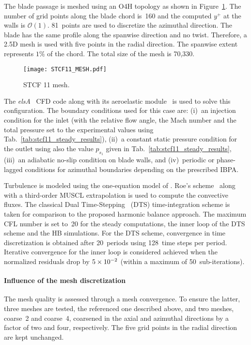 
The blade passage is meshed using an O4H topology as
shown in Figure~\ref{fig:stcf11_mesh}.
The number of grid points along the blade
chord is~160 and the computed $y^+$ at the walls is $\mathcal{O}(1)$.
81~points are used to discretize the azimuthal direction.
The blade has the same profile along the spanwise direction and no
twist. Therefore, a 2.5D mesh is used with five points 
in the radial direction. The spanwise
extent represents $1\%$ of the chord. 
The total size of the mesh is 70,330.
\begin{figure}[htp]
  \centering
  \texttt{[image: STCF11\_MESH.pdf]}
  \caption{STCF 11 mesh.}
  \label{fig:stcf11_mesh}
\end{figure}

The \textit{elsA}~\cite{Cambier2013} CFD code 
along with its aeroelastic
module~\cite{CIDugeai2011} is used to solve this configuration.
The boundary conditions used for this case are: (i)~an
injection condition  for the inlet (with the relative flow angle,
the Mach number and the total pressure
set to the experimental values using Tab.~\ref{tab:stcf11_steady_results}), 
(ii)~a constant static pressure
condition for the outlet using also the value $p_{s_1}$
given in Tab.~\ref{tab:stcf11_steady_results},  
(iii)~an adiabatic no-slip condition on
blade walls, and (iv)~periodic or phase-lagged conditions 
for azimuthal boundaries depending on the  
prescribed IBPA.

Turbulence is modeled using the one-equation model of
\citet{Spalart1992}.  Roe's scheme~\cite{Roe1981} along with a 
third-order MUSCL extrapolation 
is used to compute the convective fluxes.
The classical Dual Time-Stepping~\cite{Jameson1981} (DTS)
time-integration scheme is taken for comparison to the
proposed harmonic balance approach.
The maximum
CFL number is set to~20 for the steady computations,  the inner loop
of the DTS scheme and the HB simulations.  For the DTS scheme,  
convergence in time discretization is obtained
after 20~periods using 128~time steps per period.  Iterative convergence 
for the inner loop is considered achieved when the normalized
residuals drop by $5\times 10^{-2}$ (within a maximum of
50~sub-iterations).


\paragraph{Influence of the mesh discretization}
\label{sub:stcf11_mesh_convergence}
The mesh quality is assessed through a mesh convergence.
To ensure the latter, three meshes are tested, the referenced one
described above, and two meshes, coarse~2 and coarse~4,
coarsened in the axial and
azimuthal directions by a factor of two and four, respectively. 
The five grid points in the radial direction
are kept unchanged.

